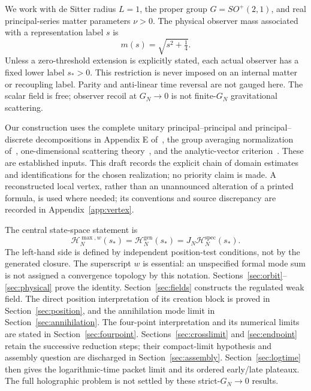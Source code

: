 \documentclass[11pt,a4paper]{article}
\numberwithin{equation}{section}
\theoremstyle{definition}
\theoremstyle{remark}
\newcommand{\cH}{\mathcal H}
\newcommand{\gen}{\mathrm{gen}}
\newcommand{\spec}{\mathrm{spec}}
\begin{document}
We work with de Sitter radius $L=1$, the proper group $G=SO^+(2,1)$, and
real principal-series matter parameters $\nu>0$. The physical observer mass
associated with a representation label $s$ is
\begin{equation}
 m(s)=\sqrt{s^2+\tfrac14}.
\end{equation}
Unless a zero-threshold extension is explicitly stated, each actual observer
has a fixed lower label $s_*>0$. This restriction is never imposed on an
internal matter or recoupling label. Parity and anti-linear time reversal are
not gauged here. The scalar field is free; observer recoil at $G_{\!N}\to0$ is not
finite-$G_N$ gravitational scattering.

Our construction uses the complete unitary principal--principal and
principal--discrete decompositions in Appendix E of~\cite{KL}, the group
averaging normalization of~\cite{MY}, one-dimensional scattering
theory~\cite{GPR,GS}, and the analytic-vector criterion~\cite{Nelson}.
These are established inputs. This draft records the explicit chain of
domain estimates and identifications for the chosen realization; no priority
claim is made. A reconstructed local vertex, rather than an unannounced
alteration of a printed formula, is used where needed; its conventions and
source discrepancy are recorded in Appendix~\ref{app:vertex}.

The central state-space statement is
\begin{equation}
 \cH_N^{\max,w}(s_*)=\cH_N^{\gen}(s_*)=J_N\cH_N^{\spec}(s_*).
 \label{eq:main-space}
\end{equation}
The left-hand side is defined by independent position-test conditions,
not by the generated closure. The superscript $w$ is essential: an
unspecified formal mode sum is not assigned a convergence topology by this
notation. Sections~\ref{sec:orbit}--\ref{sec:physical} prove the identity.
Section~\ref{sec:fields} constructs the regulated weak field. The
direct position interpretation of its creation block is proved in
Section~\ref{sec:position}, and the annihilation mode limit in
Section~\ref{sec:annihilation}. The
four-point interpretation and its numerical limits are stated in
Section~\ref{sec:fourpoint}.
Sections~\ref{sec:crosslimit} and \ref{sec:endpoint} retain the successive
reduction steps; their compact-limit hypothesis and assembly question
are discharged in Section~\ref{sec:assembly}.
Section~\ref{sec:logtime} then gives the logarithmic-time packet limit
and its ordered early/late plateaux. The full holographic problem
is not settled by these strict-$G_N\to0$ results.
\end{document}
